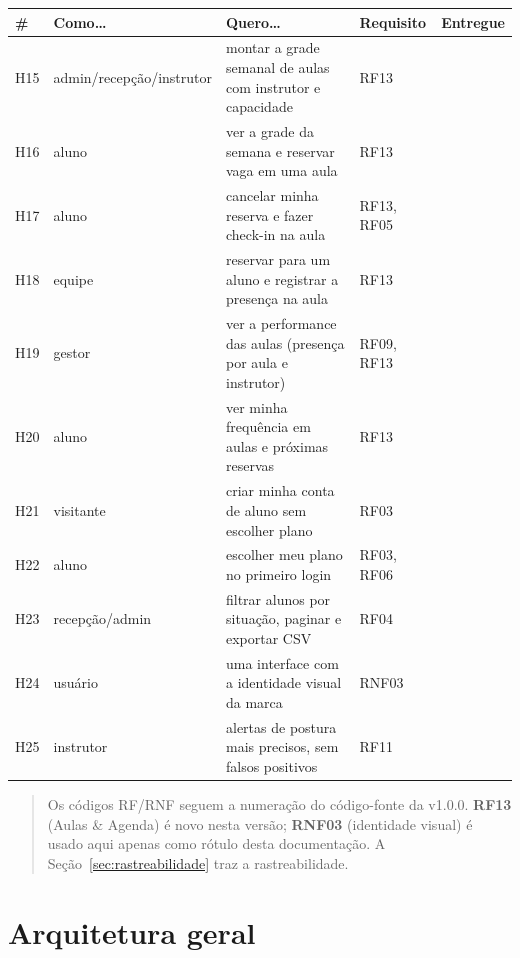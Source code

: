 \documentclass[11pt,a4paper]{article}
\newcommand{\ok}{\textcolor{sucesso}{\ding{51}}}
\begin{document}
\begin{xltabular}{\textwidth}{l R{2.4cm} Y R{2.6cm} c}
  \toprule
  \textbf{\#} & \textbf{Como\ldots} & \textbf{Quero\ldots} & \textbf{Requisito} & \textbf{Entregue} \\
  \midrule
  \endhead
  H15 & admin/recepção/instrutor & montar a grade semanal de aulas com instrutor e capacidade & RF13 & \ok \\
  H16 & aluno          & ver a grade da semana e reservar vaga em uma aula       & RF13       & \ok \\
  H17 & aluno          & cancelar minha reserva e fazer check-in na aula         & RF13, RF05 & \ok \\
  H18 & equipe         & reservar para um aluno e registrar a presença na aula   & RF13       & \ok \\
  H19 & gestor         & ver a performance das aulas (presença por aula e instrutor) & RF09, RF13 & \ok \\
  H20 & aluno          & ver minha frequência em aulas e próximas reservas       & RF13       & \ok \\
  H21 & visitante      & criar minha conta de aluno sem escolher plano           & RF03       & \ok \\
  H22 & aluno          & escolher meu plano no primeiro login                    & RF03, RF06 & \ok \\
  H23 & recepção/admin & filtrar alunos por situação, paginar e exportar CSV     & RF04       & \ok \\
  H24 & usuário        & uma interface com a identidade visual da marca          & RNF03      & \ok \\
  H25 & instrutor      & alertas de postura mais precisos, sem falsos positivos  & RF11       & \ok \\
  \bottomrule
\end{xltabular}

\begin{quote}\small
Os códigos RF/RNF seguem a numeração do código-fonte da v1.0.0. \textbf{RF13} (Aulas \& Agenda) é
novo nesta versão; \textbf{RNF03} (identidade visual) é usado aqui apenas como rótulo desta
documentação. A Seção~\ref{sec:rastreabilidade} traz a rastreabilidade.
\end{quote}

\section{Arquitetura geral}
\end{document}
